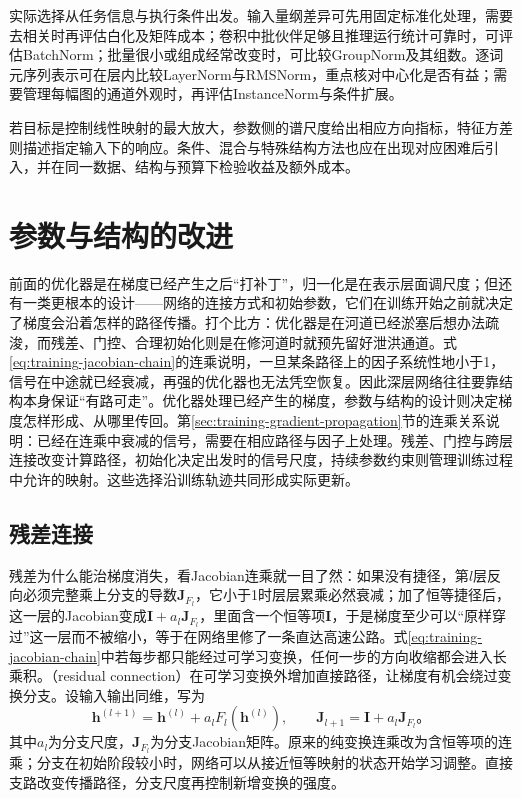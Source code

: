 实际选择从任务信息与执行条件出发。输入量纲差异可先用固定标准化处理，需要去相关时再评估白化及矩阵成本；卷积中批伙伴足够且推理运行统计可靠时，可评估BatchNorm；批量很小或组成经常改变时，可比较GroupNorm及其组数。逐词元序列表示可在层内比较LayerNorm与RMSNorm，重点核对中心化是否有益；需要管理每幅图的通道外观时，再评估InstanceNorm与条件扩展。

若目标是控制线性映射的最大放大，参数侧的谱尺度给出相应方向指标，特征方差则描述指定输入下的响应。条件、混合与特殊结构方法也应在出现对应困难后引入，并在同一数据、结构与预算下检验收益及额外成本。

\section{参数与结构的改进}
\label{sec:training-connections}

前面的优化器是在梯度已经产生之后“打补丁”，归一化是在表示层面调尺度；但还有一类更根本的设计——网络的连接方式和初始参数，它们在训练开始之前就决定了梯度会沿着怎样的路径传播。打个比方：优化器是在河道已经淤塞后想办法疏浚，而残差、门控、合理初始化则是在修河道时就预先留好泄洪通道。式\eqref{eq:training-jacobian-chain}的连乘说明，一旦某条路径上的因子系统性地小于1，信号在中途就已经衰减，再强的优化器也无法凭空恢复。因此深层网络往往要靠结构本身保证“有路可走”。优化器处理已经产生的梯度，参数与结构的设计则决定梯度怎样形成、从哪里传回。第\ref{sec:training-gradient-propagation}节的连乘关系说明：已经在连乘中衰减的信号，需要在相应路径与因子上处理。残差、门控与跨层连接改变计算路径，初始化决定出发时的信号尺度，持续参数约束则管理训练过程中允许的映射。这些选择沿训练轨迹共同形成实际更新。

\subsection{残差连接}
\label{sec:training-residual}

残差为什么能治梯度消失，看Jacobian连乘就一目了然：如果没有捷径，第$l$层反向必须完整乘上分支的导数$\bm J_{F_l}$，它小于1时层层累乘必然衰减；加了恒等捷径后，这一层的Jacobian变成$\bm I+a_l\bm J_{F_l}$，里面含一个恒等项$\bm I$，于是梯度至少可以“原样穿过”这一层而不被缩小，等于在网络里修了一条直达高速公路。式\eqref{eq:training-jacobian-chain}中若每步都只能经过可学习变换，任何一步的方向收缩都会进入长乘积。（residual connection）在可学习变换外增加直接路径，让梯度有机会绕过变换分支。设输入输出同维，写为
\begin{equation}
  \bm h^{(l+1)}=\bm h^{(l)}+a_lF_l(\bm h^{(l)}),\qquad
  \bm J_{l+1}=\bm I+a_l\bm J_{F_l}\text{。}
  \label{eq:training-residual-jacobian}
\end{equation}
其中$a_l$为分支尺度，$\bm J_{F_l}$为分支Jacobian矩阵。原来的纯变换连乘改为含恒等项的连乘；分支在初始阶段较小时，网络可以从接近恒等映射的状态开始学习调整。直接支路改变传播路径，分支尺度再控制新增变换的强度。

